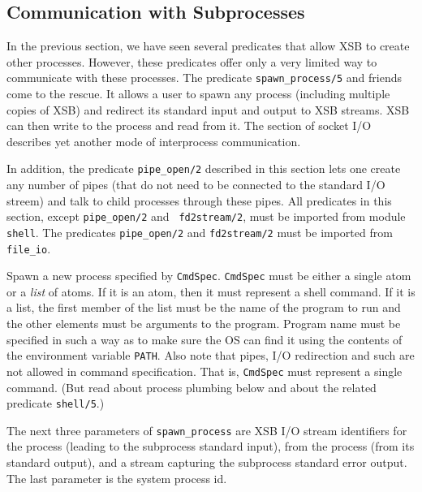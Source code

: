 \subsection{Communication with Subprocesses} \label{sec:subprocesses}

In the previous section, we have seen several predicates that allow XSB to
create other processes. However, these predicates offer only a very limited
way to communicate with these processes. The predicate
\verb|spawn_process/5| and friends come to the rescue. It allows a user to spawn
any process (including multiple copies of XSB) and redirect its
standard input and output to XSB streams. XSB can then write to the
process and read from it. The section of socket I/O describes yet
another mode of interprocess communication.

In addition, the predicate {\tt pipe\_open/2} described in this
section lets one create any number of pipes (that do not need to be
connected to the standard I/O streem) and talk to child processes
through these pipes.
%
All predicates in this section, except {\tt pipe\_open/2} and {\tt
fd2stream/2}, must be imported from module {\tt shell}.  The
predicates {\tt pipe\_open/2} and {\tt fd2stream/2} must be imported
from {\tt file\_io}.

\begin{description}
Spawn a new process specified by {\tt CmdSpec}. {\tt CmdSpec} must be
either a single atom or a \emph{list} of atoms.
If it is an atom, then it must represent a shell command.
If it is a list, the first member of the list must be the name of the
program to run and the 
other elements must be arguments to the program. Program name must be specified
in such a way as to make sure the OS can find it using the contents of the
environment variable {\tt PATH}.
Also note that pipes, I/O redirection and such are not allowed in command
specification. That is, {\tt CmdSpec} must represent a single command.
(But read about process plumbing below and about the related predicate
{\tt shell/5}.)

The next three parameters of \verb|spawn_process| are XSB I/O stream
identifiers for the process (leading to the subprocess standard
input), from the process (from its standard output), and a stream
capturing the subprocess standard error output. The last parameter is
the system process id.
\end{description}

